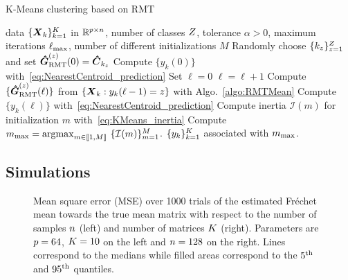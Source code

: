 \documentclass{article}
\theoremstyle{plain}
\theoremstyle{definition}
\theoremstyle{remark}
\begin{document}
\begin{algorithm}[t]
    \caption{K-Means clustering based on RMT}
    \label{algo:KMeans}
    \begin{algorithmic}
            data $\{\boldsymbol{X}_k\}_{k=1}^{K}$ in $\mathbb{R}^{p\times n}$,
            number of classes $Z$,
            tolerance $\alpha>0$,
            maximum iterations $\ell_{\textup{max}}$,
            number of different initializations $M$
        \STATE Randomly choose $\{k_z\}_{z=1}^{Z}$ and set $\boldsymbol{\hat{G}}_{\textup{RMT}}^{(z)}(0)=\boldsymbol{\hat{C}}_{k_z}$
        \STATE Compute $\{y_k(0)\}$ with~\eqref{eq:NearestCentroid_prediction}
        \STATE Set $\ell=0$
        \REPEAT
            \STATE $\ell=\ell+1$
            \STATE Compute $\{\boldsymbol{\hat{G}}_{\textup{RMT}}^{(z)}(\ell)\}$ from $\{\boldsymbol{X}_k: y_k(\ell-1)=z\}$ with Algo.~\ref{algo:RMTMean}
            \STATE Compute $\{y_k(\ell)\}$ with~\eqref{eq:NearestCentroid_prediction} 
        \STATE Compute inertia $\mathcal{I}(m)$ for initialization $m$ with~\eqref{eq:KMeans_inertia}
        \ENDFOR
        \STATE Compute $m_{\textup{max}} = \operatorname*{argmax}_{m\in\llbracket1,M\rrbracket} \,\, \{\mathcal{I}(m)\}_{m=1}^M$.
         $\{y_k\}_{k=1}^{K}$ associated with  $m_{\textup{max}}$.
    \end{algorithmic}
\end{algorithm}

\subsection{Simulations}
\label{sec:mean:simu}

\begin{figure*}
    
    \caption{Mean square error (MSE) over 1000 trials of the estimated Fréchet mean towards the true mean matrix with respect to the number of samples $n$ (left) and number of matrices $K$ (right).
    Parameters are $p=64$, $K=10$ on the left and $n=128$ on the right.
    Lines correspond to the medians while filled areas correspond to the $5^{\textup{th}}$ and $95^{\textup{th}}$ quantiles.}
    \label{fig:mse_mean}
\end{figure*}
\end{document}
